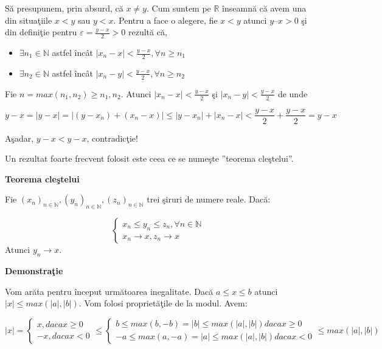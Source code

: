 \documentclass[a4paper,12pt,oneside]{report}
\begin{document}
S\u a presupunem, prin absurd, c\u a \(x \neq  y\). Cum suntem pe \(\mathbb{R}\) \^ inseamn\u a c\u a avem una din situa\c tiile \(x < y\) sau \(y < x\). Pentru a face o alegere, fie \(x < y\) atunci \(y – x > 0\) \c si din defini\c tie pentru \(\varepsilon = \frac{y- x}{2}  > 0\) rezult\u a c\u a, 

\begin{itemize}
  \item \(\exists  n_{1} \in \mathbb{N}\) astfel \^ inc\^ at \(\left | x_{n} - x  \right | < \frac{y - x }{2} , \forall n \geq n_{1} \)
  \item \(\exists  n_{2} \in \mathbb{N}\) astfel \^ inc\^ at \(\left | x_{n} - y  \right | < \frac{y - x }{2} , \forall n \geq n_{2} \)
\end{itemize}

Fie \(n = max (n _{1}, n_{2}) \geq n_{1}, n_{2}.\) Atunci \(\left | x_{n} - x \right | < \frac{y-x}{2}\) \c si \(\left | x_{n} - y  \right | <  \frac{y-x}{2}\) de unde 

\begin{displaymath}
  y-x = \left | y-x \right | = \left | (y-x_{n})+ (x_{n} -x) \right |\leq \left | y-x_{n} \right | + \left | x_{n} - x \right | < \frac{y-x}{2} + \frac{y-x}{2} = y-x
\end{displaymath}


A\c sadar, \(y-x < y-x\), contradic\c tie!

Un rezultat foarte frecvent folosit este ceea ce se nume\c ste ”teorema cle\c stelui”.

\textbf{Teorema cle\c stelui}

Fie \((x_{n})_{n\in \mathbb{N}}, (y_{n})_{n\in \mathbb{N}},(z_{n})_{n\in \mathbb{N}} \) trei \c siruri de numere reale. 
Dac\u a:

\[\left\{\begin{matrix}
x_{n} \leq  y_{n} \leq z_{n}, \forall  n \in \mathbb{N}\\ 
x_{n} \to x, z_{n} \rightarrow x

\end{matrix}\right. \]
Atunci \(y_{n} \to x\).

\textbf{Demonstra\c tie}

Vom ar\u ata pentru \^ inceput urm\u atoarea inegalitate. Dac\u a \(a \leq x\leq b\) atunci \(\left | x \right | \leq  max (\left | a \right |, \left | b \right |) \). 
Vom folosi propriet\u a\c tile de la modul. Avem:

\begin{displaymath}
  \left | x \right | = \left\{\begin{matrix} x, daca x \geq 0\\ -x, daca x< 0 \end{matrix}\right. \leq \left\{\begin{matrix} b\leq max(b,-b) = \left | b \right |\leq max(\left | a \right |,\left | b \right |) daca x\geq 0\\  -a\leq max(a,-a) = \left | a \right | 
  \leq max (\left | a \right |,\left | b \right |) daca x< 0 \end{matrix}\right. \leq max (\left | a \right |, \left | b \right |)
\end{displaymath}
 
\end{document}
